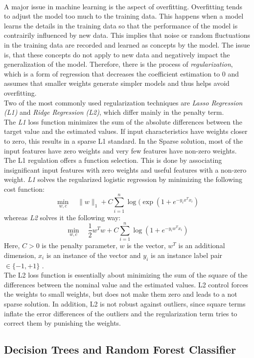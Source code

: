 \documentclass[a4paper, 11pt,titlepage,oneside,openany]{book}
\begin{document}
\\ A major issue in machine learning is the aspect of overfitting. Overfitting tends to adjust the model too much to the training data. This happens when a model learns the details in the training data so that the performance of the model is contrairily influenced by new data. This implies that noise or random fluctuations in the training data are recorded and learned as concepts by the model. The issue is, that these concepts do not apply to new data and negatively impact the generalization of the model. Therefore, there is the process of \textit{regularization}, which is a form of regression that decreases the coefficient estimation to $0$ and assumes that smaller weights generate simpler models and thus helps avoid overfitting. \\
\noindent Two of the most commonly used regularization techniques are \textit{Lasso Regression (L1)} and \textit{Ridge Regression (L2)}, which differ mainly in the penalty term. \\
\noindent The \textit{L1} loss function minimizes the sum of the absolute differences between the target value and the estimated values. If input characteristics have weights closer to zero, this results in a sparse L1 standard. In the Sparse solution, most of the input features have zero weights and very few features have non-zero weights. The L1 regulation offers a function selection. This is done by associating insignificant input features with zero weights and useful features with a non-zero weight. 
\noindent \textit{L1} solves the regularized logistic regression by minimizing the following cost function:
\[
\min_{w, c} \quad \|w\|_1 + C \sum_{i=1}^n \log(\exp(1+e^{-y_ix^Tx_i})
\]
whereas \textit{L2} solves it the following way:
\[
\min_{w, c} \quad \frac{1}{2}w^T w + C \sum_{i=1}^n \log(1+e^{-y_iw^Tx_i})
\]
Here, $C>0$ is the penalty parameter, $w$ is the vector, $w^T$ is an additional dimension, $x_i$ is an instance of the vector and $y_i$ is an instance label pair $\in \{-1,+1\}$ \cite{liblinear}.\\
The L2 loss function is essentially about minimizing the sum of the square of the differences between the nominal value and the estimated values.
L2 control forces the weights to small weights, but does not make them zero and leads to a not sparse solution. In addition, L2 is not robust against outliers, since square terms inflate the error differences of the outliers and the regularization term tries to correct them by punishing the weights.


\subsection{Decision Trees and Random Forest Classifier}
\end{document}
